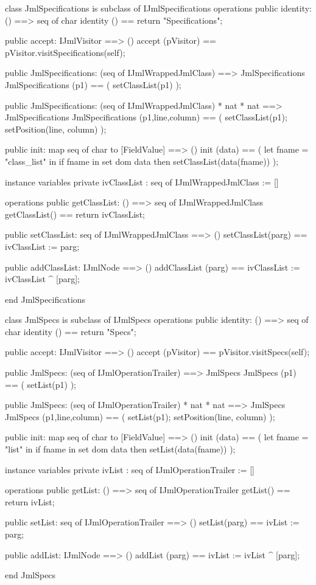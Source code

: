 \begin{vdm_al}
class JmlSpecifications is subclass of IJmlSpecifications
operations
  public identity: () ==> seq of char
  identity () == return "Specifications";

  public accept: IJmlVisitor ==> ()
  accept (pVisitor) == pVisitor.visitSpecifications(self);

  public JmlSpecifications:
    (seq of IJmlWrappedJmlClass) ==> JmlSpecifications
  JmlSpecifications (p1) == 
    ( setClassList(p1) );

  public JmlSpecifications:
    (seq of IJmlWrappedJmlClass) *
    nat *
    nat ==> JmlSpecifications
  JmlSpecifications (p1,line,column) == 
    ( setClassList(p1);
      setPosition(line, column) );

  public init: map seq of char to [FieldValue] ==> ()
  init (data) ==
    ( let fname = "class_list" in
        if fname in set dom data
        then setClassList(data(fname)) );

instance variables
  private ivClassList : seq of IJmlWrappedJmlClass := []

operations
  public getClassList: () ==> seq of IJmlWrappedJmlClass
  getClassList() == return ivClassList;

  public setClassList: seq of IJmlWrappedJmlClass ==> ()
  setClassList(parg) == ivClassList := parg;

  public addClassList: IJmlNode ==> ()
  addClassList (parg) == ivClassList := ivClassList ^ [parg];

end JmlSpecifications
\end{vdm_al}

\begin{vdm_al}
class JmlSpecs is subclass of IJmlSpecs
operations
  public identity: () ==> seq of char
  identity () == return "Specs";

  public accept: IJmlVisitor ==> ()
  accept (pVisitor) == pVisitor.visitSpecs(self);

  public JmlSpecs:
    (seq of IJmlOperationTrailer) ==> JmlSpecs
  JmlSpecs (p1) == 
    ( setList(p1) );

  public JmlSpecs:
    (seq of IJmlOperationTrailer) *
    nat *
    nat ==> JmlSpecs
  JmlSpecs (p1,line,column) == 
    ( setList(p1);
      setPosition(line, column) );

  public init: map seq of char to [FieldValue] ==> ()
  init (data) ==
    ( let fname = "list" in
        if fname in set dom data
        then setList(data(fname)) );

instance variables
  private ivList : seq of IJmlOperationTrailer := []

operations
  public getList: () ==> seq of IJmlOperationTrailer
  getList() == return ivList;

  public setList: seq of IJmlOperationTrailer ==> ()
  setList(parg) == ivList := parg;

  public addList: IJmlNode ==> ()
  addList (parg) == ivList := ivList ^ [parg];

end JmlSpecs
\end{vdm_al}

